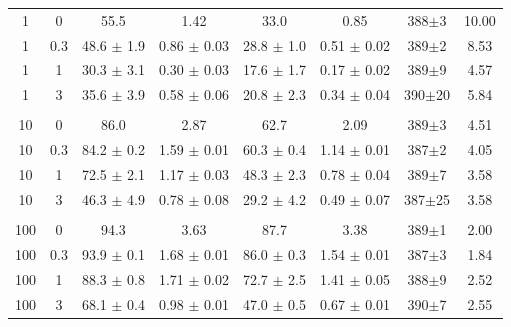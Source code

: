 \documentclass[11pt]{article}
\begin{document}
\begin{table}[htbp]
{\begin{tabular}{cccccccc}
    \\
    \hline

    1   & 0 & 55.5  &  1.42 & 33.0  &  0.85 & 388$\pm$3 & 10.00 \\ 
    1   & 0.3& 48.6 $\pm$ 1.9  &  0.86 $\pm$ 0.03 & 28.8 $\pm$ 1.0  &  0.51 $\pm$ 0.02 & 389$\pm$2 & 8.53\\ 
    1   & 1 & 30.3 $\pm$ 3.1  &  0.30 $\pm$ 0.03 & 17.6 $\pm$ 1.7  &  0.17 $\pm$ 0.02 & 389$\pm$9 & 4.57\\ 
    1   & 3 & 35.6 $\pm$ 3.9  &  0.58 $\pm$ 0.06 & 20.8 $\pm$ 2.3  &  0.34 $\pm$ 0.04 & 390$\pm$20 & 5.84\\\\ 

    10  & 0 & 86.0  &  2.87 & 62.7  &  2.09 & 389$\pm$3 & 4.51\\ 
    10  & 0.3& 84.2 $\pm$ 0.2  &  1.59 $\pm$ 0.01 & 60.3 $\pm$ 0.4  &  1.14 $\pm$ 0.01 & 387$\pm$2 & 4.05\\ 
    10  & 1 & 72.5 $\pm$ 2.1  &  1.17 $\pm$ 0.03 & 48.3 $\pm$ 2.3  &  0.78 $\pm$ 0.04 & 389$\pm$7 & 3.58\\ 
    10  & 3 & 46.3 $\pm$ 4.9  &  0.78 $\pm$ 0.08 & 29.2 $\pm$ 4.2  &  0.49 $\pm$ 0.07 & 387$\pm$25 & 3.58\\\\ 
    
    100 & 0 & 94.3  &  3.63 & 87.7  &  3.38 & 389$\pm$1 & 2.00\\
    100 & 0.3&93.9 $\pm$ 0.1  &  1.68 $\pm$ 0.01 & 86.0 $\pm$ 0.3  &  1.54 $\pm$ 0.01 & 387$\pm$3 & 1.84\\ 
    100 & 1 & 88.3 $\pm$ 0.8  &  1.71 $\pm$ 0.02 & 72.7 $\pm$ 2.5  &  1.41 $\pm$ 0.05 & 388$\pm$9 & 2.52\\ 
    100 & 3 & 68.1 $\pm$ 0.4  &  0.98 $\pm$ 0.01 & 47.0 $\pm$ 0.5  &  0.67 $\pm$ 0.01 & 390$\pm$7 & 2.55 
  \end{tabular}
}
\end{table}
\end{document}
